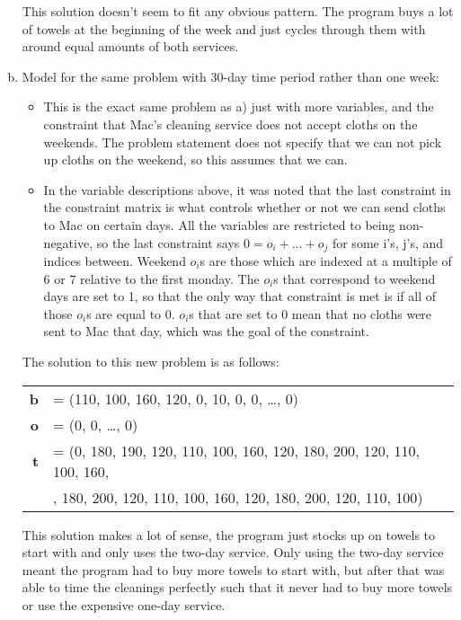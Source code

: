 \documentclass[a4paper,12pt]{article}
\begin{document}
\begin{enumerate}[a)]
      This solution doesn't seem to fit any obvious pattern. The program buys a lot of towels at the beginning of
      the week and just cycles through them with around equal amounts of both services. 

    \item Model for the same problem with 30-day time period rather than one week:

      \begin{itemize}
        \item
          This is the exact same problem as a) just with more variables, and the constraint that Mac's cleaning
          service does not accept cloths on the weekends. The problem statement does not specify that we can not
          pick up cloths on the weekend, so this assumes that we can. 

        \item
          In the variable descriptions above, it was noted that the last constraint in the constraint matrix
          is what controls whether or not we can send cloths to Mac on certain days. All the variables are restricted
          to being non-negative, so the last constraint says \(0 = o_i + \dots + o_j\) for some i's, j's, and indices
          between. Weekend \(o_i\)s are those which are indexed at a multiple of 6 or 7 
          relative to the first monday. The \(o_i\)s that correspond to weekend days are set to 1, 
          so that the only way that constraint is met is if all of those \(o_i\)s are equal to 0. \(o_i\)s that are
          set to 0 mean that no cloths were sent to Mac that day, which was the goal of the constraint.

      \end{itemize}

      The solution to this new problem is as follows:

      \begin{tabular}{r l}
        {\bf b}& = (110, 100, 160, 120, 0, 10, 0, 0, \dots , 0)\\
        {\bf o}& = (0, 0, \dots , 0)\\
        {\bf t}& = (0, 180, 190, 120, 110, 100, 160, 120, 180, 200, 120, 110, 100, 160, \\ 
        {}& \quad 120, 180, 200, 120, 110, 100, 160, 120, 180, 200, 120, 110, 100)
      \end{tabular}

      This solution makes a lot of sense, the program just stocks up on towels to start with and only uses the
      two-day service. Only using the two-day service meant the program had to buy more towels to start with, but
      after that was able to time the cleanings perfectly such that it never had to buy more towels or use the
      expensive one-day service.


\end{enumerate}
\end{document}
